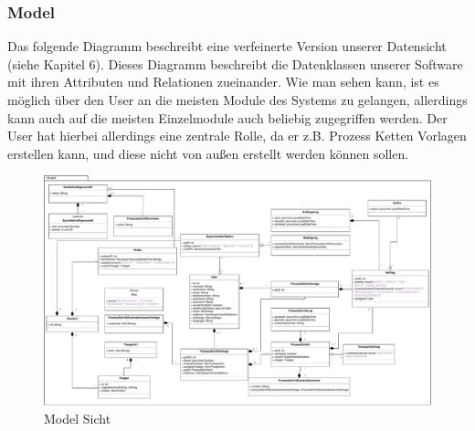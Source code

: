 \documentclass[enabledeprecatedfontcommands,fontsize=12pt,paper=a4,twoside]{scrartcl}
\begin{document}
\subsubsection{Model}
Das folgende Diagramm beschreibt eine verfeinerte Version unserer Datensicht (siehe Kapitel 6). Dieses Diagramm beschreibt die Datenklassen unserer Software mit ihren Attributen und Relationen zueinander. Wie man sehen kann, ist es möglich über den User an die meisten Module des Systems zu gelangen, allerdings kann auch auf die meisten Einzelmodule auch beliebig zugegriffen werden. Der User hat hierbei allerdings eine zentrale Rolle, da er z.B. Prozess Ketten Vorlagen erstellen kann, und diese nicht von außen erstellt werden können sollen. 
\begin{figure} 
\begin{center}
 \includegraphics[width=\textwidth]{UML/Model51.pdf}
  \caption{Model Sicht}
  \label{fig:boat1}
\end{center}
\end{figure}
\newpage
\end{document}
